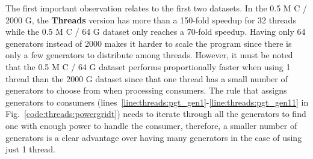 The first important observation relates to the first two datasets. In the 0.5 M
C / 2000 G, the \textbf{Threads} version has more than a 150-fold speedup for 32
threads while the 0.5 M C / 64 G dataset only reaches a 70-fold speedup. Having
only 64 generators instead of 2000 makes it harder to scale the program since
there is only a few generators to distribute among threads. However, it must be
noted that the 0.5 M C / 64 G dataset performs proportionally faster when using
1 thread than the 2000 G dataset since that one thread has a small number of
generators to choose from when processing consumers. The rule that assigns
generators to consumers
(lines~\ref{line:threads:pgt_gen1}-\ref{line:threads:pgt_gen11} in
Fig.~\ref{code:threads:powergridt}) needs to
iterate through all the generators to find one with enough power to handle the
consumer, therefore, a smaller number of generators is a clear advantage over
having many generators in the case of using just 1 thread.

